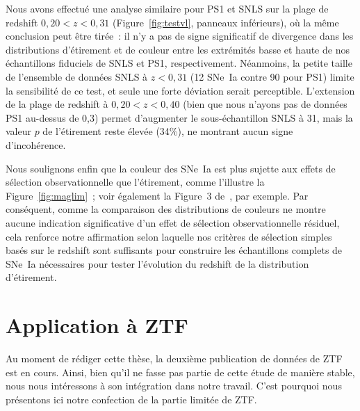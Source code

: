 \documentclass[../main/main.tex]{subfiles}
\begin{document}
Nous avons effectué une analyse similaire pour PS1 et SNLS sur la plage de
redshift $0,20 < z < 0,31$ (Figure~\ref{fig:testvl}, panneaux inférieurs), où la
même conclusion peut être tirée~: il n'y a pas de signe significatif de
divergence dans les distributions d'étirement et de couleur entre les extrémités
basse et haute de nos échantillons fiduciels de SNLS et PS1, respectivement.
Néanmoins, la petite taille de l'ensemble de données SNLS à $z < 0,31$ (12
SNe~Ia contre 90 pour PS1) limite la sensibilité de ce test, et seule une forte
déviation serait perceptible. L'extension de la plage de redshift à $0,20 < z <
0,40$ (bien que nous n'ayons pas de données PS1 au-dessus de 0,3) permet
d'augmenter le sous-échantillon SNLS à 31, mais la valeur $p$ de l'étirement
reste élevée (34\%), ne montrant aucun signe d'incohérence.

Nous soulignons enfin que la couleur des SNe~Ia est plus sujette aux effets de
sélection observationnelle que l'étirement, comme l'illustre la
Figure~\ref{fig:maglim}~; voir également la Figure~3 de~\cite{kessler2017}, par
exemple. Par conséquent, comme la comparaison des distributions de couleurs ne
montre aucune indication significative d'un effet de sélection observationnelle
résiduel, cela renforce notre affirmation selon laquelle nos critères de
sélection simples basés sur le redshift sont suffisants pour construire les
échantillons complets de SNe~Ia nécessaires pour tester l'évolution du redshift
de la distribution d'étirement.

\section{Application à ZTF}\label{sec:ztfsam}
Au moment de rédiger cette thèse, la deuxième publication de données de ZTF est
en cours. Ainsi, bien qu'il ne fasse pas partie de cette étude de manière
stable, nous nous intéressons à son intégration dans notre travail. C'est
pourquoi nous présentons ici notre confection de la partie limitée de ZTF.

\end{document}
